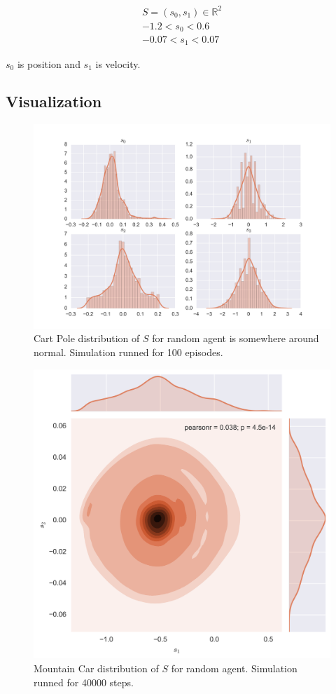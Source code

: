 \documentclass[12pt]{article}
\begin{document}
\begin{multline*}
 S = (s_0, s_1) \in \mathbb{R}^2 \\
-1.2 < s_0 < 0.6 \\
-0.07 < s_1 < 0.07
\end{multline*}

$s_0$ is position and $s_1$ is velocity.

\subsection{Visualization}

\begin{figure}[h]
\includegraphics[width=\textwidth]{exploratory_cartpole.png} 
\centering
\caption{Cart Pole distribution of $S$ for random agent is somewhere around normal. Simulation runned for 100 episodes.}
\end{figure}

\begin{figure}[h]
\includegraphics[width=\textwidth]{exploratory_mountaincar.png} 
\centering
\caption{Mountain Car distribution of $S$ for random agent. Simulation runned for 40000 steps.}
\end{figure}
\end{document}
